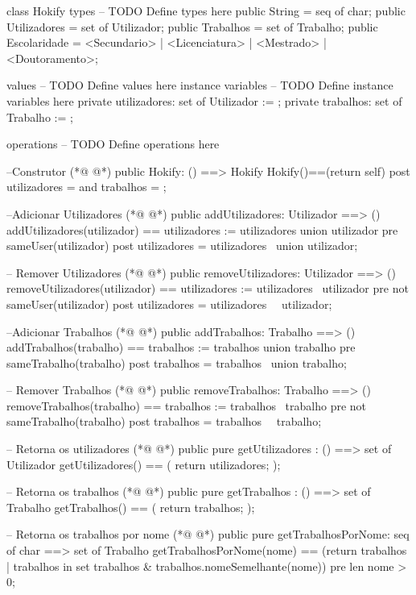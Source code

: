 \begin{vdmpp}[breaklines=true]
class Hokify
types
-- TODO Define types here
 public String = seq of char;
 public Utilizadores = set of Utilizador;
 public Trabalhos = set of Trabalho;
 public Escolaridade = <Secundario> | <Licenciatura> | <Mestrado> | <Doutoramento>;
 
values
-- TODO Define values here
instance variables
-- TODO Define instance variables here
 private utilizadores: set of Utilizador := {};
 private trabalhos: set of Trabalho := {};
 
operations
-- TODO Define operations here
 
 --Construtor
(*@
\label{Hokify:20}
@*)
 public Hokify: () ==> Hokify
 Hokify()==(return self)
 post utilizadores = {} and
   trabalhos = {};
 
 
 --Adicionar Utilizadores
(*@
\label{addUtilizadores:27}
@*)
 public addUtilizadores: Utilizador ==> ()
 addUtilizadores(utilizador) == utilizadores := utilizadores union {utilizador}
 pre sameUser(utilizador)
 post utilizadores = utilizadores~ union {utilizador};
 
 -- Remover Utilizadores
(*@
\label{removeUtilizadores:33}
@*)
 public removeUtilizadores: Utilizador ==> ()
 removeUtilizadores(utilizador) == utilizadores := utilizadores \ {utilizador}
 pre not sameUser(utilizador)
 post utilizadores = utilizadores~ \ {utilizador};
 
 --Adicionar Trabalhos
(*@
\label{addTrabalhos:39}
@*)
 public addTrabalhos: Trabalho ==> ()
 addTrabalhos(trabalho) == trabalhos := trabalhos union {trabalho}
 pre sameTrabalho(trabalho)
 post trabalhos = trabalhos~ union {trabalho};
 
 -- Remover Trabalhos
(*@
\label{removeTrabalhos:45}
@*)
 public removeTrabalhos: Trabalho ==> ()
 removeTrabalhos(trabalho) == trabalhos := trabalhos \ {trabalho}
 pre not sameTrabalho(trabalho)
 post trabalhos = trabalhos~ \ {trabalho};
 
 -- Retorna os utilizadores
(*@
\label{getUtilizadores:51}
@*)
 public pure getUtilizadores : () ==> set of Utilizador
 getUtilizadores() ==
 (
  return utilizadores;
 );
 
 -- Retorna os trabalhos
(*@
\label{getTrabalhos:58}
@*)
 public pure getTrabalhos : () ==> set of Trabalho
 getTrabalhos() ==
 (
  return trabalhos;
 );
 
 -- Retorna os trabalhos por nome
(*@
\label{getTrabalhosPorNome:65}
@*)
 public pure getTrabalhosPorNome: seq of char ==> set of Trabalho
 getTrabalhosPorNome(nome) == (return {trabalhos | trabalhos in set trabalhos & trabalhos.nomeSemelhante(nome)})
 pre len nome > 0;
 

\end{vdmpp}

